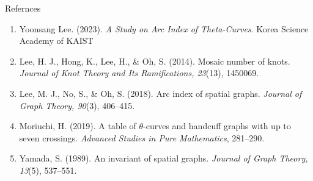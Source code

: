 \documentclass[final]{beamer}
\begin{document}
\begin{frame}[t]
\begin{columns}[t]
  \begin{block}{Refernces}
    \begin{enumerate}
      \item Yoonsang Lee. (2023). \textit{A Study on Arc Index of Theta-Curves}. Korea Science Academy of KAIST
      \item Lee, H. J., Hong, K., Lee, H., \& Oh, S. (2014). Mosaic number of knots. \textit{Journal of Knot Theory and Its Ramifications, 23}(13), 1450069.
      \item Lee, M. J., No, S., \& Oh, S. (2018). Arc index of spatial graphs. \textit{Journal of Graph Theory, 90}(3), 406–415.
      \item Moriuchi, H. (2019). A table of $\theta$-curves and handcuff graphs with up to seven crossings. \textit{Advanced Studies in Pure Mathematics}, 281–290.
      \item Yamada, S. (1989). An invariant of spatial graphs. \textit{Journal of Graph Theory, 13}(5), 537–551.
      
    \end{enumerate}
  \end{block}

\end{columns}

\end{frame}
\end{document}
